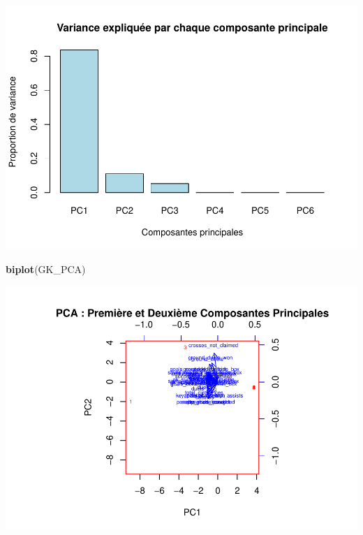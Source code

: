 \documentclass[
  6pt,
]{article}
\newenvironment{Shaded}{\begin{snugshade}}{\end{snugshade}}
\newcommand{\FunctionTok}[1]{\textcolor[rgb]{0.13,0.29,0.53}{\textbf{#1}}}
\newcommand{\NormalTok}[1]{#1}
\begin{document}
\includegraphics{Analyse_Impact_Performances_Joueurs_files/figure-latex/unnamed-chunk-2-1.pdf}

\begin{Shaded}
\begin{Highlighting}[]
\FunctionTok{biplot}\NormalTok{(GK\_PCA)}
\end{Highlighting}
\end{Shaded}

\includegraphics{Analyse_Impact_Performances_Joueurs_files/figure-latex/unnamed-chunk-2-2.pdf}
\end{document}
